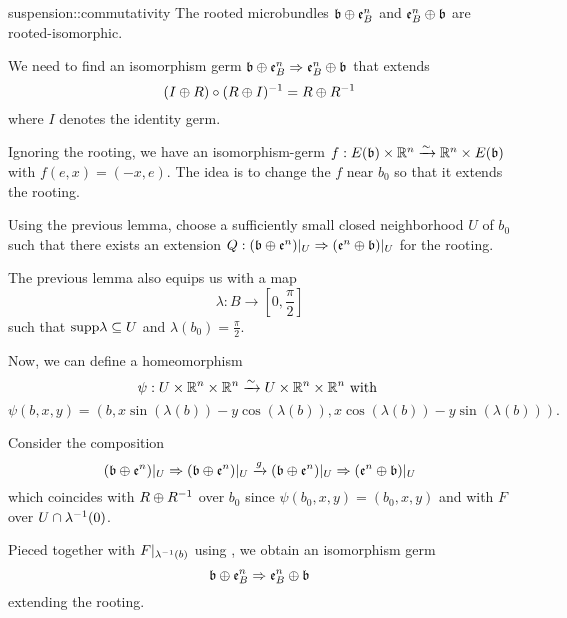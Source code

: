\begin{mylemma}{suspension::commutativity}
    The rooted microbundles $\mathfrak{b} \oplus{} \mathfrak{e}^{n}_B$ and $\mathfrak{e}^{n}_B \oplus{} \mathfrak{b}$ are rooted-isomorphic. 
\end{mylemma}

\begin{myproof}
    We need to find an isomorphism germ
    $\mathfrak{b} \oplus{} \mathfrak{e}^{n}_B \Rightarrow{} \mathfrak{e}^{n}_B \oplus{} \mathfrak{b}$ that extends
    \[ (I \oplus{} R) \circ (R \oplus{} I)^{-1} = R \oplus{} R^{-1} \]
    where $I$ denotes the identity germ.

    Ignoring the rooting, we have an
    isomorphism-germ $f: E(\mathfrak{b}) \times \mathbb{R}^n \xrightarrow{\sim} \mathbb{R}^n \times E(\mathfrak{b})$ with $f(e, x) = (-x, e)$.
    The idea is to change the $f$ near $b_0$ so that it extends the rooting.

    Using the previous lemma, choose a sufficiently small closed neighborhood $U$ of $b_0$
    such that there exists an extension
    $Q: (\mathfrak{b} \oplus{} \mathfrak{e}^{n})\vert_{U} \Rightarrow{} (\mathfrak{e}^{n} \oplus{} \mathfrak{b})\vert_{U}$ for the rooting.

    The previous lemma also equips us with a map
    \[ \lambda: B \to [0, \frac{\pi}{2}] \]
    such that $\text{supp} \lambda \subseteq{} U$ and $\lambda(b_0) = \frac{\pi}{2}$.
    
    Now, we can define a homeomorphism
    \[ \psi: U \times \mathbb{R}^n \times \mathbb{R}^n \xrightarrow{\sim} U \times \mathbb{R}^n \times \mathbb{R}^n \text{ with } \]
    \[ \psi(b, x, y) = (b, x \sin(\lambda(b)) - y \cos(\lambda(b)), x \cos(\lambda(b)) - y \sin(\lambda(b))). \]

    Consider the composition
    \[ (\mathfrak{b} \oplus{} \mathfrak{e}^{n})\vert_{U} \Rightarrow{} (\mathfrak{b} \oplus{} \mathfrak{e}^{n})\vert_{U} \xrightarrow{g} (\mathfrak{b} \oplus{} \mathfrak{e}^{n})\vert_{U} \Rightarrow{} (\mathfrak{e}^{n} \oplus{} \mathfrak{b})\vert_{U} \]
    which coincides with $R \oplus{} R^{-1}$ over $b_0$
    since $\psi(b_0, x, y) = (b_0, x, y)$ and with $F$ over $U \cap \lambda^{-1}(0)$.
    
    Pieced together with $F\vert_{\lambda^{-1}(b)}$ using ,
    we obtain an isomorphism germ 
    \[ \mathfrak{b} \oplus{} \mathfrak{e}^{n}_B \Rightarrow{} \mathfrak{e}^{n}_B \oplus{} \mathfrak{b} \]
    extending the rooting.
\end{myproof}